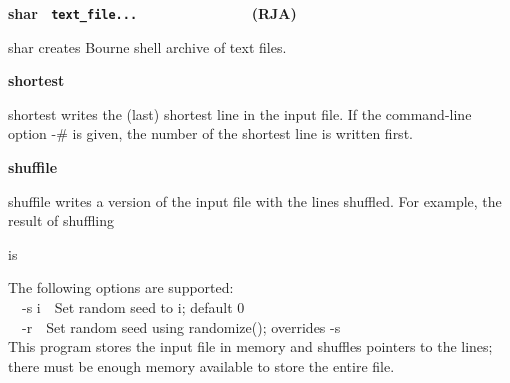 {{\sffamily\bfseries
shar
\ \texttt{\textmd{text\_file...\ \ \ \ \ \ \ \ \ \ \ \ \ \ \ \ }}(RJA)}

\textsf{shar} creates Bourne shell archive of text files. 

{\sffamily\bfseries
shortest\ \ \ \ \ \ \ \ \ \ \ \ \ \ \ \ \ \ \ \ }

\textsf{shortest} writes the (last) shortest line in the input file. If
the command-line option -\# is given, the number of the shortest line
is written first. 

{\sffamily\bfseries
shuffile\ \ \ \ \ \ \ \ \ \ \ \ \ \ \ \ \ \ \ \ }

\textsf{shuffile} writes a version of the input file with the lines
shuffled. For example, the result of shuffling 


is


The following options are supported:\\
\ \ \textsf{{}-s i}\ \ Set random seed to \textsf{i}; default 0\\
\ \ \textsf{{}-r}\ \ Set random seed using \textsf{randomize()};
overrides \textsf{{}-s}\\
This program stores the input file in memory and shuffles pointers to
the lines; there must be enough memory available to store the entire
file.

}
